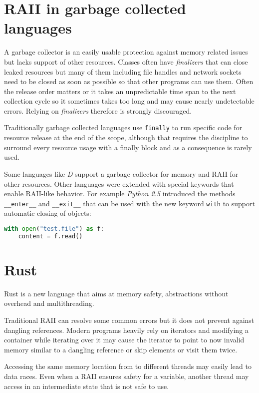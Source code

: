 \documentclass[conference,twocolumn]{IEEEtran}
\begin{document}
\section{RAII in garbage collected languages}
A garbage collector is an easily usable protection against memory related issues but lacks support of other resources. Classes often have \emph{finalizers} that can close leaked resources but many of them including file handles and network sockets need to be closed as soon as possible so that other programs can use them. Often the release order matters or it takes an unpredictable time span to the next collection cycle so it sometimes takes too long and may cause nearly undetectable errors. Relying on \emph{finalizers} therefore is strongly discouraged.

Traditionally garbage collected languages use \verb|finally| to run specific code for resource release at the end of the scope, although that requires the discipline to surround every resource usage with a finally block and as a consequence is rarely used.

Some languages like \emph{D} support a garbage collector for memory and RAII for other resources. Other languages were extended with special keywords that enable RAII-like behavior. For example \emph{Python 2.5} introduced the methods \verb|__enter__| and \verb|__exit__| that can be used with the new keyword \verb|with| to support automatic closing of objects:
\begin{lstlisting}[language=python,frame=single]
with open("test.file") as f:
    content = f.read()
\end{lstlisting}



\section{Rust}
Rust is a new language that aims at memory safety, abstractions without overhead and multithreading.

Traditional RAII can resolve some common errors but it does not prevent against dangling references. Modern programs heavily rely on iterators and modifying a container while iterating over it may cause the iterator to point to now invalid memory similar to a dangling reference or skip elements or visit them twice.

Accessing the same memory location from to different threads may easily lead to data races. Even when a RAII ensures safety for a variable, another thread may access in an intermediate state that is not safe to use.
\end{document}
